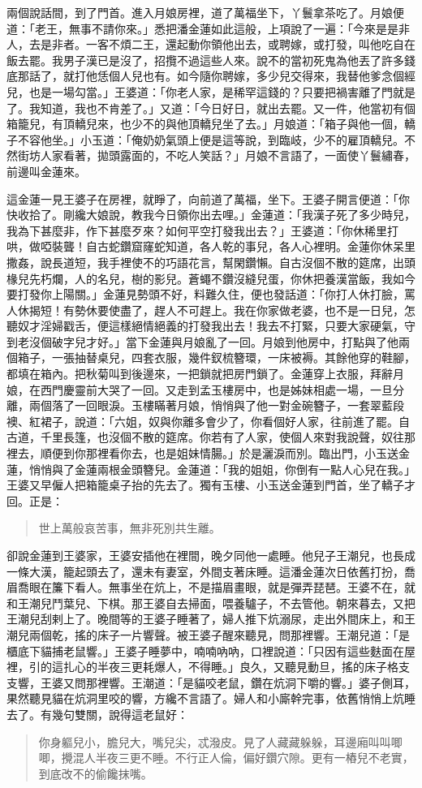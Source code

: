 兩個說話間，到了門首。進入月娘房裡，道了萬福坐下，丫鬟拿茶吃了。月娘便道：「老王，無事不請你來。」悉把潘金蓮如此這般，上項說了一遍：「今來是是非人，去是非者。一客不煩二王，還起動你領他出去，或聘嫁，或打發，叫他吃自在飯去罷。我男子漢已是沒了，招攬不過這些人來。說不的當初死鬼為他丟了許多錢底那話了，就打他恁個人兒也有。如今隨你聘嫁，多少兒交得來，我替他爹念個經兒，也是一場勾當。」王婆道：「你老人家，是稀罕這錢的？只要把禍害離了門就是了。我知道，我也不肯差了。」又道：「今日好日，就出去罷。又一件，他當初有個箱籠兒，有頂轎兒來，也少不的與他頂轎兒坐了去。」月娘道：「箱子與他一個，轎子不容他坐。」小玉道：「俺奶奶氣頭上便是這等說，到臨岐，少不的雇頂轎兒。不然街坊人家看著，拋頭露面的，不吃人笑話？」月娘不言語了，一面使丫鬟繡春，前邊叫金蓮來。

這金蓮一見王婆子在房裡，就睜了，向前道了萬福，坐下。王婆子開言便道：「你快收拾了。剛纔大娘說，教我今日領你出去哩。」金蓮道：「我漢子死了多少時兒，我為下甚麼非，作下甚麼歹來？如何平空打發我出去？」王婆道：「你休稀里打哄，做啞裝聾！自古蛇鑽窟窿蛇知道，各人乾的事兒，各人心裡明。金蓮你休呆里撒姦，說長道短，我手裡使不的巧語花言，幫閑鑽懶。自古沒個不散的筵席，出頭椽兒先朽爛，人的名兒，樹的影兒。蒼蠅不鑽沒縫兒蛋，你休把養漢當飯，我如今要打發你上陽關。」金蓮見勢頭不好，料難久住，便也發話道：「你打人休打臉，罵人休揭短！有勢休要使盡了，趕人不可趕上。我在你家做老婆，也不是一日兒，怎聽奴才淫婦戳舌，便這樣絕情絕義的打發我出去！我去不打緊，只要大家硬氣，守到老沒個破字兒才好。」當下金蓮與月娘亂了一回。月娘到他房中，打點與了他兩個箱子，一張抽替桌兒，四套衣服，幾件釵梳簪環，一床被褥。其餘他穿的鞋腳，都填在箱內。把秋菊叫到後邊來，一把鎖就把房門鎖了。金蓮穿上衣服，拜辭月娘，在西門慶靈前大哭了一回。又走到孟玉樓房中，也是姊妹相處一場，一旦分離，兩個落了一回眼淚。玉樓瞞著月娘，悄悄與了他一對金碗簪子，一套翠藍段襖、紅裙子，說道：「六姐，奴與你離多會少了，你看個好人家，往前進了罷。自古道，千里長篷，也沒個不散的筵席。你若有了人家，使個人來對我說聲，奴往那裡去，順便到你那裡看你去，也是姐妹情腸。」於是灑淚而別。臨出門，小玉送金蓮，悄悄與了金蓮兩根金頭簪兒。金蓮道：「我的姐姐，你倒有一點人心兒在我。」王婆又早僱人把箱籠桌子抬的先去了。獨有玉樓、小玉送金蓮到門首，坐了轎子才回。正是：
\begin{quote}
世上萬般哀苦事，無非死別共生離。
\end{quote}

卻說金蓮到王婆家，王婆安插他在裡間，晚夕同他一處睡。他兒子王潮兒，也長成一條大漢，籠起頭去了，還未有妻室，外間支著床睡。這潘金蓮次日依舊打扮，喬眉喬眼在簾下看人。無事坐在炕上，不是描眉畫眼，就是彈弄琵琶。王婆不在，就和王潮兒鬥葉兒、下棋。那王婆自去掃面，喂養驢子，不去管他。朝來暮去，又把王潮兒刮剌上了。晚間等的王婆子睡著了，婦人推下炕溺尿，走出外間床上，和王潮兒兩個乾，搖的床子一片響聲。被王婆子醒來聽見，問那裡響。王潮兒道：「是櫃底下貓捕老鼠響。」王婆子睡夢中，喃喃吶吶，口裡說道：「只因有這些麩面在屋裡，引的這扎心的半夜三更耗爆人，不得睡。」良久，又聽見動旦，搖的床子格支支響，王婆又問那裡響。王潮道：「是貓咬老鼠，鑽在炕洞下嚼的響。」婆子側耳，果然聽見貓在炕洞里咬的響，方纔不言語了。婦人和小廝幹完事，依舊悄悄上炕睡去了。有幾句雙關，說得這老鼠好：
\begin{quote}
你身軀兒小，膽兒大，嘴兒尖，忒潑皮。見了人藏藏躲躲，耳邊廂叫叫唧唧，攪混人半夜三更不睡。不行正人倫，偏好鑽穴隙。更有一樁兒不老實，到底改不的偷饞抹嘴。
\end{quote}

